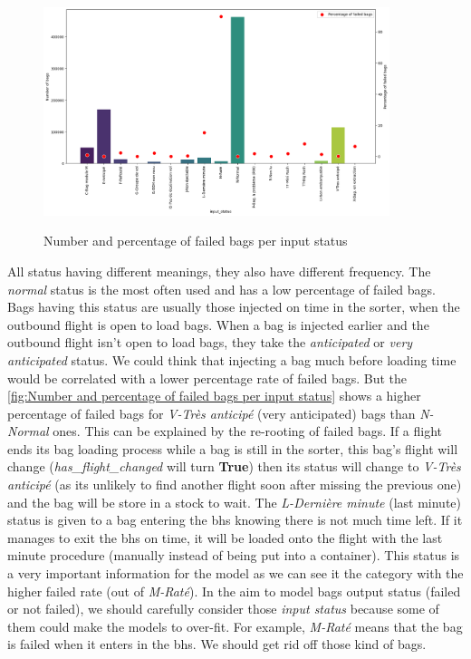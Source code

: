 \documentclass[12pt]{article}
\begin{document}
\begin{figure}[h]
    \centering
    \includegraphics[width=0.9\textwidth]{failed bags per input status.png}\\
    \caption{Number and percentage of failed bags per input status}
    \label{fig:Number and percentage of failed bags per input status}
\end{figure}
\FloatBarrier

All status having different meanings, they also have different frequency. The \textit{normal} status is the most often used and has a low percentage of failed bags. Bags having this status are usually those injected on time in the sorter, when the outbound flight is open to load bags. When a bag is injected earlier and the outbound flight isn't open to load bags, they take the \textit{anticipated} or \textit{very anticipated} status. We could think that injecting a bag much before loading time would be correlated with a lower percentage rate of failed bags. But the \autoref{fig:Number and percentage of failed bags per input status} shows a higher percentage of failed bags for \textit{V-Très anticipé} (very anticipated) bags than \textit{N-Normal} ones. This can be explained by the re-rooting of failed bags. If a flight ends its bag loading process while a bag is still in the sorter, this bag's flight will change (\textit{has\_flight\_changed} will turn \textbf{True}) then its status will change to \textit{V-Très anticipé} (as its unlikely to find another flight soon after missing the previous one) and the bag will be store in a stock to wait.
\noindent The \textit{L-Dernière minute} (last minute) status is given to a bag entering the \acrshort{bhs} knowing there is not much time left. If it manages to exit the \acrshort{bhs} on time, it will be loaded onto the flight with the last minute procedure (manually instead of being put into a container). This status is a very important information for the model as we can see it the category with the higher failed rate (out of \textit{M-Raté}).
\noindent In the aim to model bags output status (failed or not failed), we should carefully consider those \textit{input status} because some of them could make the models to over-fit. For example, \textit{M-Raté} means that the bag is failed when it enters in the \acrshort{bhs}. We should get rid off those kind of bags. 
\end{document}
